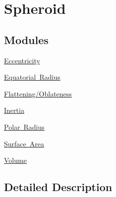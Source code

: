 \hypertarget{group___e_g_x_math-_geometry-3_d-_spheroid}{}\section{Spheroid}
\label{group___e_g_x_math-_geometry-3_d-_spheroid}
\subsection*{Modules}
\begin{DoxyCompactItemize}
\item 
\mbox{\hyperlink{group___e_g_x_math-_geometry-3_d-_spheroid-_eccentricity}{Eccentricity}}
\item 
\mbox{\hyperlink{group___e_g_x_math-_geometry-3_d-_spheroid-_equatorial_radius}{Equatorial Radius}}
\item 
\mbox{\hyperlink{group___e_g_x_math-_geometry-3_d-_spheroid-_flattening}{Flattening/\+Oblateness}}
\item 
\mbox{\hyperlink{group___e_g_x_math-_geometry-3_d-_spheroid-_inertia}{Inertia}}
\item 
\mbox{\hyperlink{group___e_g_x_math-_geometry-3_d-_spheroid-_polar_radius}{Polar Radius}}
\item 
\mbox{\hyperlink{group___e_g_x_math-_geometry-3_d-_spheroid-_surface_area}{Surface Area}}
\item 
\mbox{\hyperlink{group___e_g_x_math-_geometry-3_d-_spheroid-_volume}{Volume}}
\end{DoxyCompactItemize}


\subsection{Detailed Description}
